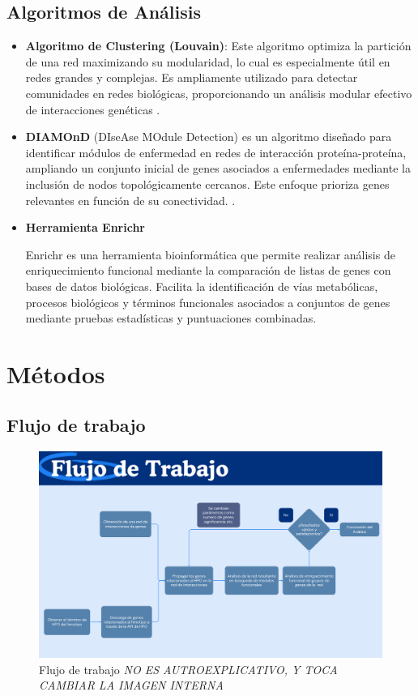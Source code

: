 \subsection{Algoritmos de Análisis}


\begin{itemize}
	\item \textbf{Algoritmo de Clustering (Louvain)}: Este algoritmo optimiza la partición de una red maximizando su modularidad, lo cual es especialmente útil en redes grandes y complejas. Es ampliamente utilizado para detectar comunidades en redes biológicas, proporcionando un análisis modular efectivo de interacciones genéticas \cite{Blondel2008}.
	
	\item \textbf{DIAMOnD} (DIseAse MOdule Detection) es un algoritmo diseñado para identificar módulos de enfermedad en redes de interacción proteína-proteína, ampliando un conjunto inicial de genes asociados a enfermedades mediante la inclusión de nodos topológicamente cercanos. Este enfoque prioriza genes relevantes en función de su conectividad. \cite{Ghiassian2015}.

	\item \textbf{Herramienta Enrichr}
	
	Enrichr es una herramienta bioinformática que permite realizar análisis de enriquecimiento funcional mediante la comparación de listas de genes con bases de datos biológicas. Facilita la identificación de vías metabólicas, procesos biológicos y términos funcionales asociados a conjuntos de genes mediante pruebas estadísticas y puntuaciones combinadas.\cite{10.1093/nar/gkad393/1}
	
	
\end{itemize}



\section{Métodos}

\subsection{Flujo de trabajo}

\begin{figure}[h!]
	\includegraphics[width=.95\textwidth]{figures/workflow.png}
	\caption{Flujo de trabajo \textit{NO ES AUTROEXPLICATIVO, Y TOCA CAMBIAR LA IMAGEN INTERNA}}
	\label{fig:workflow}
\end{figure}

